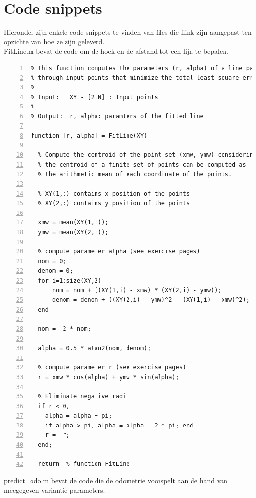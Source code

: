 \documentclass[a4paper]{article}
\begin{document}
\section{Code snippets}
Hieronder zijn enkele code snippets te vinden van files die flink zijn aangepast ten opzichte van hoe ze zijn geleverd.\\
FitLine.m bevat de code om de hoek en de afstand tot een lijn te bepalen.
\begin{lstlisting}[caption= Fitline.m, label=lst:checkconcat, numbers=left]
%---------------------------------------------------------------------
% This function computes the parameters (r, alpha) of a line passing
% through input points that minimize the total-least-square error.
%
% Input:   XY - [2,N] : Input points
%          
% Output:  r, alpha: paramters of the fitted line

function [r, alpha] = FitLine(XY)
  
  % Compute the centroid of the point set (xmw, ymw) considering that 
  % the centroid of a finite set of points can be computed as
  % the arithmetic mean of each coordinate of the points.

  % XY(1,:) contains x position of the points
  % XY(2,:) contains y position of the points  

  xmw = mean(XY(1,:));
  ymw = mean(XY(2,:));

  % compute parameter alpha (see exercise pages)
  nom = 0;
  denom = 0;
  for i=1:size(XY,2)
      nom = nom + ((XY(1,i) - xmw) * (XY(2,i) - ymw));
      denom = denom + ((XY(2,i) - ymw)^2 - (XY(1,i) - xmw)^2);
  end
  
  nom = -2 * nom;
  
  alpha = 0.5 * atan2(nom, denom);
  
  % compute parameter r (see exercise pages)
  r = xmw * cos(alpha) + ymw * sin(alpha);
  
  % Eliminate negative radii
  if r < 0,
    alpha = alpha + pi;
    if alpha > pi, alpha = alpha - 2 * pi; end
    r = -r;
  end;
  
  return  % function FitLine
\end{lstlisting}
predict\_odo.m bevat de code die de odometrie voorspelt aan de hand van meegegeven variantie parameters.
\end{document}
